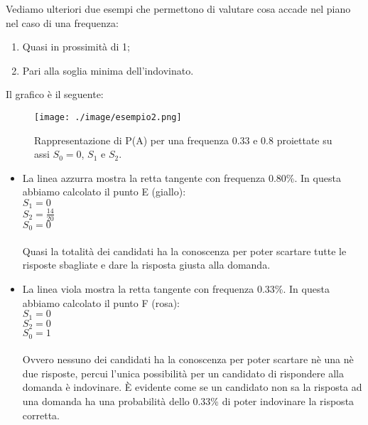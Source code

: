\noindent
Vediamo ulteriori due esempi che permettono di valutare cosa accade nel piano nel caso di una frequenza:
\begin{enumerate} 
\item Quasi in prossimit\`a di 1;
\item Pari alla soglia minima dell'indovinato.
\end{enumerate}
\noindent

Il grafico \`e il seguente:

\begin{figure}[H]
\centering
	\texttt{[image: ./image/esempio2.png]}
	\caption{Rappresentazione di P(A) per una frequenza 0.33 e 0.8 proiettate su assi $S_0=0$, $S_1$ e $S_2$.}
\end{figure}

\begin{itemize}
\item La linea azzurra mostra la retta tangente con frequenza 0.80\%.
In questa abbiamo calcolato il punto E (giallo):\\
$S_1=0$\\
$S_2=\frac{14}{20}$\\
$S_0=0$\\
\\
Quasi la totalit\`a dei candidati ha la conoscenza per poter scartare tutte le risposte sbagliate e dare la risposta giusta alla domanda.
\item La linea viola mostra la retta tangente con frequenza 0.33\%.
In questa abbiamo calcolato il punto F (rosa):\\
$S_1=0$\\
$S_2=0$\\
$S_0=1$\\
\\ 
Ovvero nessuno dei candidati ha la conoscenza per poter scartare n\`e una n\`e due risposte, percui l'unica possibilit\`a per un candidato di rispondere alla domanda \`e indovinare. \`E evidente come se un candidato non sa la risposta ad una domanda ha una probabilit\`a dello 0.33\% di poter indovinare la risposta corretta.
\end{itemize}


